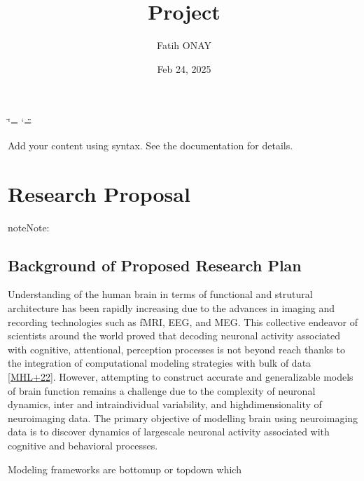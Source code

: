 \documentclass[letterpaper,10pt,english]{sphinxmanual}
\title{Project}
\date{Feb 24, 2025}
\author{Fatih ONAY}
\begin{document}
\ifdefined\shorthandoff
  \ifnum\catcode`\=\string=\active\shorthandoff{=}\fi
  \ifnum\catcode`\"=\active{}\fi
\fi

\pagestyle{empty}
\sphinxmaketitle
\pagestyle{plain}
\sphinxtableofcontents
\pagestyle{normal}
\label{\detokenize{index::doc}}


\sphinxAtStartPar
Add your content using  syntax. See the
documentation for details.

\sphinxstepscope


\chapter{Research Proposal}
\label{\detokenize{Project Proposal:research-proposal}}\label{\detokenize{Project Proposal::doc}}
\begin{sphinxadmonition}{note}{Note:}
\sphinxAtStartPar
{}
\end{sphinxadmonition}


\section{Background of Proposed Research Plan}
\label{\detokenize{Project Proposal:background-of-proposed-research-plan}}
\sphinxAtStartPar
Understanding of the human brain in terms of functional and strutural architecture has been rapidly increasing
due to the advances in imaging and recording technologies such as fMRI, EEG, and MEG. This collective endeavor
of scientists around the world proved that decoding neuronal activity associated with cognitive, attentional, perception
processes is not beyond reach thanks to the integration of computational modeling strategies with bulk of data {[}\hyperlink{cite.index:id2}{MHL+22}{]}.
However, attempting to construct accurate and generalizable models of brain function remains a challenge due to the complexity
of neuronal dynamics, inter and intra\sphinxhyphen{}individual variability, and high\sphinxhyphen{}dimensionality of neuroimaging data. The primary
objective of modelling brain using neuroimaging data is to discover dynamics of large\sphinxhyphen{}scale neuronal activity associated with
cognitive and behavioral processes.

\sphinxAtStartPar
Modeling frameworks are bottom\sphinxhyphen{}up or top\sphinxhyphen{}down which
\end{document}
